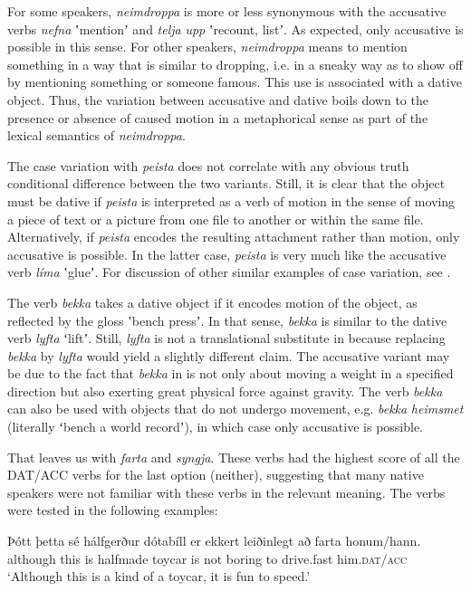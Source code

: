 \documentclass[output=paper,modfonts,nonflat,colorlinks,citecolor=brown]{langsci/langscibook}
\begin{document}
For some speakers, \textit{neimdroppa} is more or less synonymous with the accusative verbs \textit{nefna} ʽmentionʼ and \textit{telja} \textit{upp} ʽrecount, listʼ. As expected, only accusative is possible in this sense. For other speakers,  \textit{neimdroppa} means to mention something in a way that is similar to dropping, i.e. in a sneaky way as to show off by mentioning something or someone famous. This use is associated with a dative object. Thus, the variation between accusative and dative boils down to the presence or absence of caused motion in a metaphorical sense as part of the lexical semantics of \textit{neimdroppa}.

The case variation with \textit{peista} does not correlate with any obvious truth conditional difference between the two variants. Still, it is clear that the object must be dative if \textit{peista} is interpreted as a verb of motion in the sense of moving a piece of text or a picture from one file to another or within the same file. Alternatively, if \textit{peista} encodes the resulting attachment rather than motion, only accusative is possible. In the latter case, \textit{peista} is very much like the accusative verb \textit{líma} ʽglueʼ. For discussion of other similar examples of case variation, see \citet{Jónsson2013a}.

The verb \textit{bekka} takes a dative object if it encodes motion of the object, as reflected by the gloss ʽbench pressʼ. In that sense, \textit{bekka} is similar to the dative verb \textit{lyfta} ʻliftʼ. Still, \textit{lyfta} is not a translational substitute in  because replacing \textit{bekka} by \textit{lyfta} would yield a slightly different claim. The accusative variant may be due to the fact that \textit{bekka} in  is not only about moving a weight in a specified direction but also exerting great physical force against gravity. The verb \textit{bekka} can also be used with objects that do not undergo movement, e.g. \textit{bekka} \textit{heimsmet} (literally ʻbench a world recordʼ), in which case only accusative is possible.

That leaves us with \textit{farta} and \textit{syngja}. These verbs had the highest score of all the DAT/ACC verbs for the last option (neither), suggesting that many native speakers were not familiar with these verbs in the relevant meaning. The verbs were tested in the following examples:


\ea
    \label{ex:jonsson:8}
\ea%
\gll  Þótt  þetta  sé  hálfgerður  dótabíll  er  ekkert  leiðinlegt  að  farta  honum/hann.\\
   although  this  is  halfmade  toycar  is  not  boring  to  {drive.fast}  him.\textsc{dat/acc}\\
\glt `Although this is a kind of a toycar, it is fun to speed.'
\end{document}
